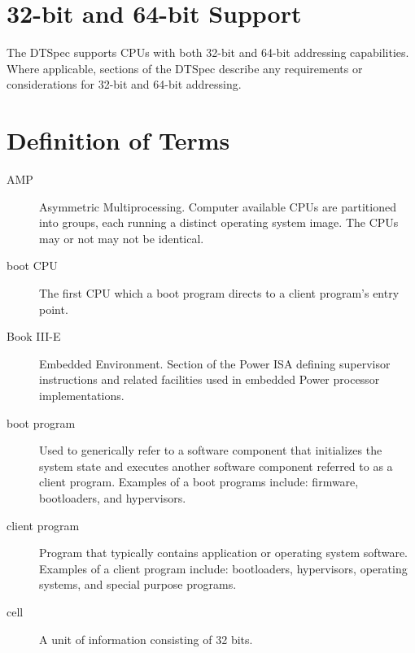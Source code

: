 \documentclass[a4paper,10pt,oneside]{sphinxmanual}
\begin{document}
\section{32-bit and 64-bit Support}
\label{introduction:bit-and-64-bit-support}
The DTSpec supports CPUs with both 32-bit and 64-bit addressing
capabilities. Where applicable, sections of the DTSpec describe any
requirements or considerations for 32-bit and 64-bit addressing.


\section{Definition of Terms}
\label{introduction:definition-of-terms}\begin{description}
\item[{AMP}] \leavevmode{}\label{introduction:term-amp}
Asymmetric Multiprocessing. Computer available CPUs are partitioned into
groups, each running a distinct operating system image. The CPUs
may or not may not be identical.

\item[{boot CPU}] \leavevmode{}\label{introduction:term-boot-cpu}
The first CPU which a boot program directs to a client program’s
entry point.

\item[{Book III-E}] \leavevmode{}\label{introduction:term-book-iii-e}
Embedded Environment. Section of the Power ISA defining supervisor
instructions and related facilities used in embedded Power processor
implementations.

\item[{boot program}] \leavevmode{}\label{introduction:term-boot-program}
Used to generically refer to a software component that initializes
the system state and executes another software component referred to
as a client program. Examples of a boot programs include: firmware,
bootloaders, and hypervisors.

\item[{client program}] \leavevmode{}\label{introduction:term-client-program}
Program that typically contains application or operating system
software. Examples of a client program include: bootloaders,
hypervisors, operating systems, and special purpose programs.

\item[{cell}] \leavevmode{}\label{introduction:term-cell}
A unit of information consisting of 32 bits.


\end{description}
\end{document}
